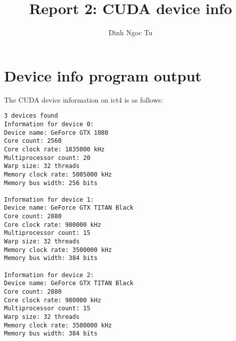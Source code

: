 \documentclass[12pt]{article}
\title{Report 2: CUDA device info}
\author{Dinh Ngoc Tu}
\begin{document}
\maketitle


\section{Device info program output}

The CUDA device information on ict4 is as follows:

\begin{lstlisting}[breaklines]
3 devices found
Information for device 0:
Device name: GeForce GTX 1080
Core count: 2560
Core clock rate: 1835000 kHz
Multiprocessor count: 20
Warp size: 32 threads
Memory clock rate: 5005000 kHz
Memory bus width: 256 bits

Information for device 1:
Device name: GeForce GTX TITAN Black
Core count: 2880
Core clock rate: 980000 kHz
Multiprocessor count: 15
Warp size: 32 threads
Memory clock rate: 3500000 kHz
Memory bus width: 384 bits

Information for device 2:
Device name: GeForce GTX TITAN Black
Core count: 2880
Core clock rate: 980000 kHz
Multiprocessor count: 15
Warp size: 32 threads
Memory clock rate: 3500000 kHz
Memory bus width: 384 bits
\end{lstlisting}

\end{document}

